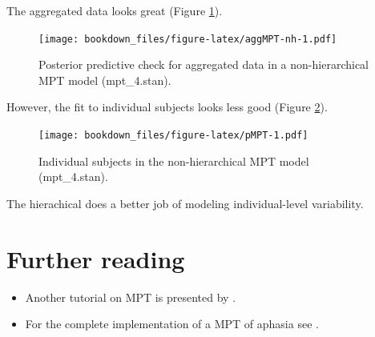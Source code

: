 \documentclass[12pt,]{krantz}
\newenvironment{Shaded}{\begin{snugshade}}{\end{snugshade}}
\newcommand{\KeywordTok}[1]{\textcolor[rgb]{0.13,0.29,0.53}{\textbf{#1}}}
\newcommand{\DataTypeTok}[1]{\textcolor[rgb]{0.13,0.29,0.53}{#1}}
\newcommand{\StringTok}[1]{\textcolor[rgb]{0.31,0.60,0.02}{#1}}
\newcommand{\OperatorTok}[1]{\textcolor[rgb]{0.81,0.36,0.00}{\textbf{#1}}}
\newcommand{\NormalTok}[1]{#1}
\providecommand{\tightlist}{%
  \setlength{\itemsep}{0pt}\setlength{\parskip}{0pt}}
\theoremstyle{definition}
\theoremstyle{definition}
\theoremstyle{definition}
\theoremstyle{remark}
\begin{document}
The aggregated data looks great (Figure \ref{fig:aggMPT-nh}).

\begin{Shaded}
\end{Shaded}

\begin{figure}
\centering
\texttt{[image: bookdown\_files/figure-latex/aggMPT-nh-1.pdf]}
\caption{\label{fig:aggMPT-nh}Posterior predictive check for aggregated data
in a non-hierarchical MPT model (mpt\_4.stan).}
\end{figure}

However, the fit to individual subjects looks less good (Figure
\ref{fig:pMPT}).

\begin{Shaded}
\end{Shaded}

\begin{figure}
\centering
\texttt{[image: bookdown\_files/figure-latex/pMPT-1.pdf]}
\caption{\label{fig:pMPT}Individual subjects in the non-hierarchical MPT
model (mpt\_4.stan).}
\end{figure}

The hierachical does a better job of modeling individual-level
variability.

\section{Further reading}\label{further-reading-11}

\begin{itemize}
\tightlist
\item
  Another tutorial on MPT is presented by
  \citet{matzkeBayesianEstimationMultinomial2015}.
\item
  For the complete implementation of a MPT of aphasia see
  \citet{WalkerEtAl2018}.
\end{itemize}
\end{document}
